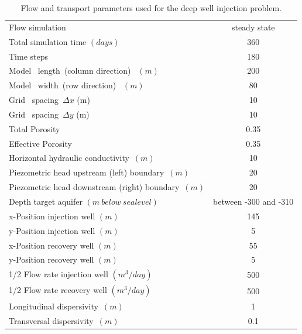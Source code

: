 \begin{table}
\caption{Flow and transport parameters used for the deep well injection problem.}
\begin{center}
\begin{tabular}{lc} \hline
Flow simulation                     & steady state \\
Total simulation time $(days)$       & 360  \\
Time steps         & 180 \\
Model \  length\ (column direction) \ $ (m)      $         &  200            \\
Model \  width\  (row direction) \ $ (m)      $         &   80            \\
Grid \ spacing\ $\Delta x $ (m)                &   10            \\
Grid \ spacing\ $\Delta y $ (m)                &   10            \\
Total Porosity\     $            $         &  0.35           \\
Effective Porosity\     $            $         &  0.35           \\
Horizontal hydraulic conductivity\ $(m)           $         &  10         \\  
Piezometric head upstream (left) boundary\ $(m)          $         &  20           \\ 
Piezometric head downstream (right) boundary\ $(m)        $         &  20           \\ 
Depth target aquifer $(m \ below \ sealevel)   $         &  between -300 and -310          \\ 
x-Position injection well $(m)   $         & 145          \\
y-Position injection well $(m)   $         &   5         \\
x-Position recovery well $(m)    $         &  55          \\
y-Position recovery well $(m)    $         &   5         \\
1/2 Flow rate injection well $(m^3/day)   $         &  500         \\
1/2 Flow rate recovery well $(m^3/day)    $         &  500         \\
Longitudinal dispersivity\ $(m)         $         &  1          \\ 
Transversal  dispersivity\ $(m)         $         &  0.1          \\ \hline

\end{tabular}
\label{ex_model_grid}
\end{center}
\end{table}

